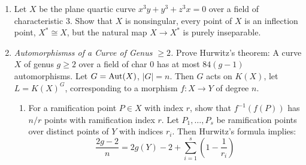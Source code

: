\documentclass{article}
\begin{document}
\begin{enumerate} [label=\textbf{\arabic*.}, leftmargin=0em]
\begin{enumerate}[label=(\alph*)]
    \item Show that for all but a finite number of points on $X$, a point lies on exactly $(d + 1)(d - 2)$ tangents of $X$, not counting the tangent at that point.

    \item Show that the degree of the morphism $\varphi$ in (a) is $d(d - 1)$.
    Conclude that if $d \geq 2$, then $X$ has $3d(d - 2)$ inflection points, properly counted (if $T_P(X)$ has intersection multiplicity $r$, then $P$ is counted $r - 2$ times).
    Show that an ordinary inflection point corresponds to an ordinary cusp of $X^*$.

    \item Let $X$ be a plane curve of degree $d \geq 2$, and suppose $X^*$ has only nodes and ordinary cusps.
    Then show that $X$ has exactly $\frac{1}{2}d(d - 2)(d - 3)(d + 3)$ bitangents.
    [Hint: Use normalization and compute $p_a(X^*)$ in two ways.]

    \item For example, a plane cubic curve has exactly 9 inflection points, all ordinary.
    The line joining any two of them intersects the curve in a third one

    \item A plane quartic has exactly 28 bitangents.
    (This holds even if the curve has a tangent with four-fold contact, in which case the dual curve $X^*$ has a tacnode.)
\end{enumerate}

\item Let $X$ be the plane quartic curve $x^3 y + y^3 + z^3 x = 0$ over a field of characteristic 3.
Show that $X$ is nonsingular, every point of $X$ is an inflection point, $X^* \cong X$, but the natural map $X \to X^*$ is purely inseparable.

\item \textit{Automorphismss of a Curve of Genus $\geq 2$.} Prove Hurwitz's theorem: A curve $X$ of genus $g \geq 2$ over a field of char 0 has at most $84(g - 1)$ automorphisms.
Let $G = \operatorname{Aut}(X)$, $|G| = n$. Then $G$ acts on $K(X)$, let $L = K(X)^G$, corresponding to a morphism $f: X \to Y$ of degree $n$.
\begin{enumerate}[label=(\alph*)]
    \item For a ramification point $P \in X$ with index $r$, show that $f^{-1}(f(P))$ has $n/r$ points with ramification index $r$.
    Let $P_1, \dots, P_s$ be ramification points over distinct points of $Y$ with indices $r_i$. Then Hurwitz's formula implies:
    \[
    \frac{2g - 2}{n} = 2g(Y) - 2 + \sum_{i=1}^s \left(1 - \frac{1}{r_i}\right)
    \]


\end{enumerate}
\end{enumerate}
\end{document}
